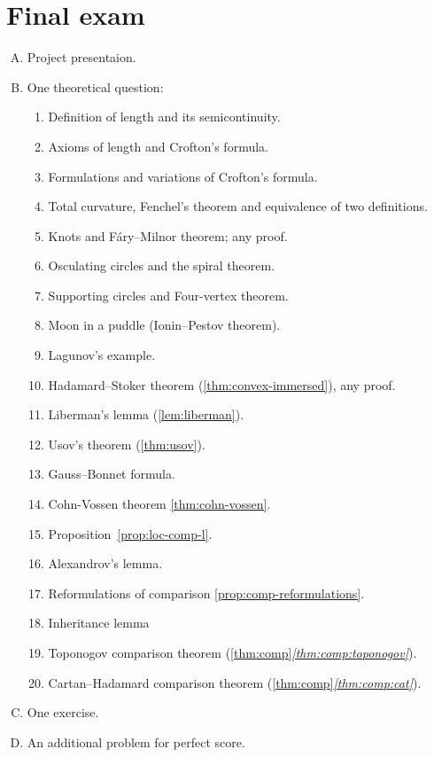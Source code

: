 \chapter{Final exam}


\begin{enumerate}[A.]
\item Project presentaion.
\item One theoretical question:
\begin{enumerate}[1.]
\item Definition of length and its semicontinuity.
\item Axioms of length and Crofton's formula.
\item Formulations and variations of Crofton's formula.
\item Total curvature, Fenchel's theorem and equivalence of two definitions.
\item Knots and F\'ary--Milnor theorem; any proof.
\item Osculating circles and the spiral theorem.
\item Supporting circles and Four-vertex theorem. 
\item Moon in a puddle (Ionin--Pestov theorem).
\item Lagunov's example.
\item Hadamard--Stoker theorem (\ref{thm:convex-immersed}), any proof.
\item Liberman's lemma (\ref{lem:liberman}).
\item Usov's theorem (\ref{thm:usov}).
\item Gauss--Bonnet formula.
\item Cohn-Vossen theorem \ref{thm:cohn-vossen}.
\item Proposition~\ref{prop:loc-comp-l}.
\item Alexandrov's lemma.
\item Reformulations of comparison \ref{prop:comp-reformulations}.
\item Inheritance lemma
\item Toponogov comparison theorem (\ref{thm:comp}\textit{\ref{thm:comp:toponogov}}).
\item Cartan--Hadamard comparison theorem (\ref{thm:comp}\textit{\ref{thm:comp:cat}}).
\end{enumerate}

\item One exercise.

\item An additional problem for perfect score.
\end{enumerate}


